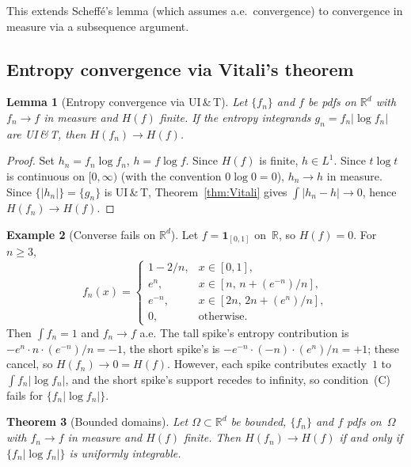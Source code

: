 \documentclass[journal]{IEEEtran}
\newtheorem{theorem}{Theorem}
\newtheorem{lemma}[theorem]{Lemma}
\theoremstyle{definition}
\newtheorem{example}[theorem]{Example}
\theoremstyle{remark}
\newcommand{\Rd}{\mathbb{R}^d}
\newcommand{\R}{\mathbb{R}}
\newcommand{\1}{\mathbf{1}}
\newcommand{\Hent}{H}
\newcommand{\abs}[1]{\lvert #1 \rvert}
\begin{document}
This extends Scheff\'{e}'s lemma (which assumes a.e.\ convergence)
to convergence in measure via a subsequence argument.

\subsection{Entropy convergence via Vitali's theorem}

\begin{lemma}[Entropy convergence via UI\,\&\,T]\label{thm:NS}
Let $\{f_n\}$ and $f$ be pdfs on $\Rd$ with $f_n \to f$ in measure
and $\Hent(f)$ finite.  If the entropy integrands
$g_n = f_n \abs{\log f_n}$ are UI\,\&\,T, then
$\Hent(f_n) \to \Hent(f)$.
\end{lemma}

\begin{proof}
Set $h_n = f_n \log f_n$, $h = f \log f$.  Since $\Hent(f)$ is
finite, $h \in L^1$.  Since $t \log t$ is continuous on
$[0,\infty)$ (with the convention $0\log 0 = 0$),
$h_n \to h$ in measure.  Since $\{\abs{h_n}\} = \{g_n\}$
is UI\,\&\,T, Theorem~\ref{thm:Vitali} gives
$\int \abs{h_n - h} \to 0$, hence $\Hent(f_n) \to \Hent(f)$.
\end{proof}

\begin{example}[Converse fails on $\Rd$]\label{ex:converse-fails}
Let $f = \1_{[0,1]}$ on~$\R$, so $\Hent(f) = 0$.  For $n \geq 3$,
\[
  f_n(x) = \begin{cases}
    1 - 2/n, & x \in [0,1], \\
    e^n, & x \in [n,\, n + (e^{-n})/n], \\
    e^{-n}, & x \in [2n,\, 2n + (e^n)/n], \\
    0, & \text{otherwise}.
  \end{cases}
\]
Then $\int f_n = 1$ and $f_n \to f$ a.e.  The tall spike's entropy
contribution is $-e^n \cdot n \cdot (e^{-n})/n = -1$, the short
spike's is $-e^{-n} \cdot (-n) \cdot (e^n)/n = +1$; these cancel,
so $\Hent(f_n) \to 0 = \Hent(f)$.
However, each spike contributes exactly~$1$
to $\int f_n \abs{\log f_n}$, and the short spike's support recedes
to infinity, so condition~(C) fails for $\{f_n\abs{\log f_n}\}$.
\end{example}

\begin{theorem}[Bounded domains]\label{prop:compact-iff}
Let $\Omega \subset \Rd$ be bounded, $\{f_n\}$ and $f$ pdfs
on~$\Omega$ with $f_n \to f$ in measure and $\Hent(f)$ finite.  Then
$\Hent(f_n) \to \Hent(f)$ if and only if
$\{f_n \abs{\log f_n}\}$ is uniformly integrable.
\end{theorem}
\end{document}
